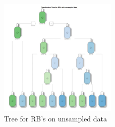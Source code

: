\documentclass[]{article}
\begin{document}
\begin{figure}
\hypertarget{id}{%
\centering
\includegraphics[width=0.5\textwidth,height=\textheight]{../../Project_Scripts/RBtreeNS.jpg}
\caption{Tree for RB's on unsampled data}\label{id}
}
\end{figure}
\end{document}
